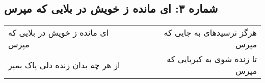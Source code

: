 \begin{center}
\section*{شماره ۳: ای مانده ز خویش در بلایی که مپرس}
\label{sec:003}
\begin{longtable}{l p{0.5cm} r}
ای مانده ز خویش در بلایی که مپرس
&&
هرگز نرسیدهای به جایی که مپرس
\\
از هر چه بدان زنده دلی پاک بمیر
&&
تا زنده شوی به کبریایی که مپرس
\\
\end{longtable}
\end{center}
